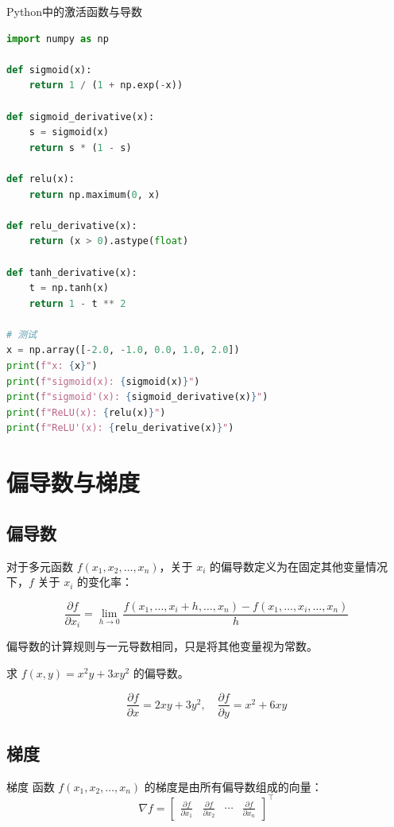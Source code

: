 \begin{mycode}{Python中的激活函数与导数}
\begin{lstlisting}[language=Python]
import numpy as np

def sigmoid(x):
    return 1 / (1 + np.exp(-x))

def sigmoid_derivative(x):
    s = sigmoid(x)
    return s * (1 - s)

def relu(x):
    return np.maximum(0, x)

def relu_derivative(x):
    return (x > 0).astype(float)

def tanh_derivative(x):
    t = np.tanh(x)
    return 1 - t ** 2

# 测试
x = np.array([-2.0, -1.0, 0.0, 1.0, 2.0])
print(f"x: {x}")
print(f"sigmoid(x): {sigmoid(x)}")
print(f"sigmoid'(x): {sigmoid_derivative(x)}")
print(f"ReLU(x): {relu(x)}")
print(f"ReLU'(x): {relu_derivative(x)}")
\end{lstlisting}
\end{mycode}

\section{偏导数与梯度}

\subsection{偏导数}

对于多元函数 $f(x_1,x_2,\ldots,x_n)$，关于 $x_i$ 的偏导数定义为在固定其他变量情况下，$f$ 关于 $x_i$ 的变化率：

\[
\frac{\partial f}{\partial x_i} = \lim_{h\to 0} \frac{f(x_1,\ldots,x_i+h,\ldots,x_n)-f(x_1,\ldots,x_i,\ldots,x_n)}{h}
\]

偏导数的计算规则与一元导数相同，只是将其他变量视为常数。

\begin{example}
求 $f(x,y)=x^2y+3xy^2$ 的偏导数。

\[
\frac{\partial f}{\partial x} = 2xy + 3y^2, \quad \frac{\partial f}{\partial y} = x^2 + 6xy
\]
\end{example}

\subsection{梯度}

\begin{mydefinition}{梯度}
函数 $f(x_1,x_2,\ldots,x_n)$ 的梯度是由所有偏导数组成的向量：
\[
\nabla f = \begin{bmatrix}
\frac{\partial f}{\partial x_1} & \frac{\partial f}{\partial x_2} & \cdots & \frac{\partial f}{\partial x_n}
\end{bmatrix}^{\top}
\]
\end{mydefinition}

